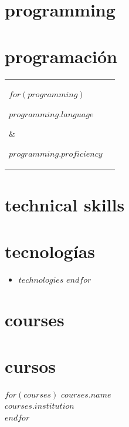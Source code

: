 \documentclass[letterpaper,11pt]{article}
\newcommand{\lightfont}[1]{{%
    {\hlight\color{light-gray}#1}
  }}
\newcommand{\lightbf}[1]{{%
    \textbf{\lightfont{#1}}
  }}
\newcommand{\emphasized}[1]{{%
    {\fontsize{12pt}{14pt}\textbf{#1}}
  }}
\begin{document}
\begin{minipage}[t]{0.31\textwidth}
  \raggedright
        {\section{programming}}
        {\section{programación}}%
    \setlength{\parskip}{1mm}
    \setlength{\hwide}{\dimexpr.5\hsize-3\tabcolsep}
    \hlight
    \begin{tabular}{@{}p{\hwide}p{\centerwide}}
      $for(programming)$
        \parbox[t][][t]{\hwide}{%
          \emphasized{$programming.language$}
          \medskip
        } & %
        \parbox[t][][t]{\centerwide}{%
          \lightbf{$programming.proficiency$}
          \medskip
        } \\ %
      $endfor$
    \end{tabular}

        {\section{technical skills}}
        {\section{tecnologías}}%
    \hlight
    \begin{itemize}[]
      $for(technologies)$
      \item{$technologies$}
      $endfor$
    \end{itemize}

        {\section{courses}}
        {\section{cursos}}%
    \hlight
    $for(courses)$
    \emphasized{$courses.name$} \\
    \lightfont{\textbf{$courses.institution$}} \\
    $endfor$
\end{minipage}%
%
\newlength{\hwideright}
\end{document}
